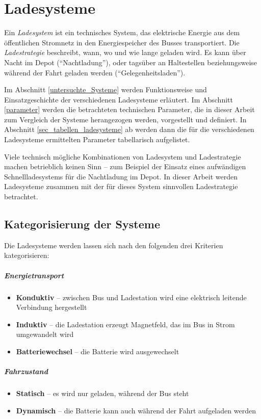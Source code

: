 \chapter{Ladesysteme}
Ein \emph{Ladesystem} ist ein technisches System, das elektrische Energie aus dem öffentlichen Stromnetz in den Energiespeicher des Busses transportiert. Die \emph{Ladestrategie} beschreibt, wann, wo und wie lange geladen wird. Es kann über Nacht im Depot ("`Nachtladung"'), oder tagsüber an Haltestellen beziehungsweise während der Fahrt geladen werden ("`Gelegenheitsladen"').

Im  Abschnitt \ref{untersuchte_Systeme} werden Funktionsweise und Einsatzgeschichte der verschiedenen Ladesysteme erläutert. Im Abschnitt \ref{parameter} werden die betrachteten technischen Parameter, die in dieser Arbeit zum Vergleich der Systeme herangezogen werden, vorgestellt und definiert. In Abschnitt \ref{sec_tabellen_ladesysteme} ab werden dann die für die verschiedenen Ladesysteme ermittelten Parameter tabellarisch aufgelistet. 

Viele technisch mögliche Kombinationen von Ladesystem und Ladestrategie machen betrieblich keinen Sinn – zum Beispiel der Einsatz eines aufwändigen Schnellladesystems für die Nachtladung im Depot. In dieser Arbeit werden Ladesysteme zusammen mit der für dieses System sinnvollen Ladestrategie betrachtet.

\section{Kategorisierung der Systeme}
Die Ladesysteme werden lassen sich nach den folgenden drei Kriterien kategorisieren:

\paragraph{Energietransport}
\begin{itemize}
	\item \textbf{Konduktiv} – zwischen Bus und Ladestation wird eine elektrisch leitende Verbindung hergestellt
	\item \textbf{Induktiv} – die Ladestation erzeugt Magnetfeld, das im Bus in Strom umgewandelt wird
	\item \textbf{Batteriewechsel} – die Batterie wird ausgewechselt
\end{itemize}

\paragraph{Fahrzustand}
\begin{itemize}
	\item \textbf{Statisch} – es wird nur geladen, während der Bus steht
	\item \textbf{Dynamisch} – die Batterie kann auch während der Fahrt aufgeladen werden
\end{itemize}


